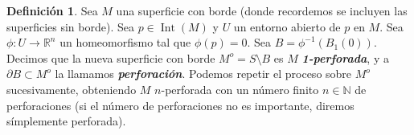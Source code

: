\documentclass[10pt]{report}
\newcommand{\R}{\mathbb{R}}
\newcommand{\N}{\mathbb{N}}
\DeclareMathOperator{\interior}{Int} %
\newcommand{\enfatiza}[1]{\textbf{\textit{#1}}}
\theoremstyle{definition}
\newtheorem{defin}{Definición}[section]
\begin{document}
\begin{defin}%
\label{def:perforacion}
Sea $M$ una superficie con borde (donde recordemos se incluyen las superficies sin borde). Sea $p\in \interior (M)$ y $U$ un entorno abierto de $p$ en $M$. Sea $\phi :U\to \R^n$ un homeomorfismo tal que $\phi (p)=0$. Sea $B=\phi ^{-1}(B_1(0))$. Decimos que la nueva superficie con borde $M^o=S\setminus B$ es $M$ \enfatiza{1-perforada}, y a $\partial B\subset M^o$ la llamamos \enfatiza{perforación}. Podemos repetir el proceso sobre $M^o$ sucesivamente, obteniendo $M$ $n$-perforada con un número finito $n\in \N$ de perforaciones (si el número de perforaciones no es importante, diremos símplemente perforada). 
\end{defin}

\end{document}
